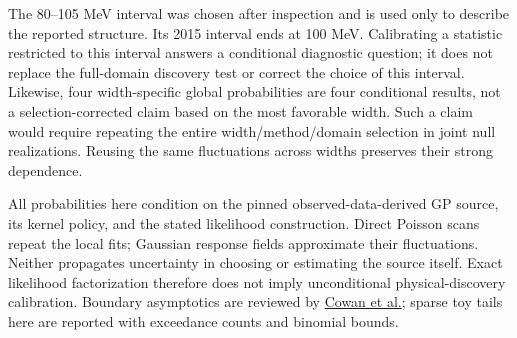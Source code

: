 The 80--105 MeV interval was chosen after inspection and is used only to
describe the reported structure. Its 2015 interval ends at 100 MeV.
Calibrating a statistic restricted to this interval answers a conditional
diagnostic question; it does not replace the full-domain discovery test or
correct the choice of this interval. Likewise, four width-specific global
probabilities are four conditional results, not a selection-corrected claim
based on the most favorable width. Such a claim would require repeating the
entire width/method/domain selection in joint null realizations. Reusing
the same fluctuations across widths preserves their strong dependence.

All probabilities here condition on the pinned observed-data-derived GP
source, its kernel policy, and the stated likelihood construction. Direct
Poisson scans repeat the local fits; Gaussian response fields approximate
their fluctuations. Neither propagates uncertainty in choosing or estimating
the source itself. Exact likelihood factorization therefore does not imply
unconditional physical-discovery calibration. Boundary asymptotics are
reviewed by \href{https://arxiv.org/abs/1007.1727}{Cowan et al.}; sparse toy
tails here are reported with exceedance counts and binomial bounds.
